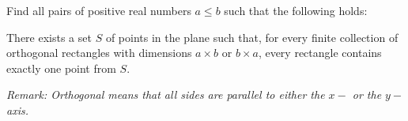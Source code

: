 Find all pairs of positive real numbers $a\leq b$ such that the following holds:

There exists a set $S$ of points in the plane such that, for every finite collection of orthogonal rectangles with dimensions $a\times b$ or $b\times a$, every rectangle contains exactly one point from $S$.

\emph{Remark: Orthogonal means that all sides are parallel to either the $x-$ or the $y-$axis.}